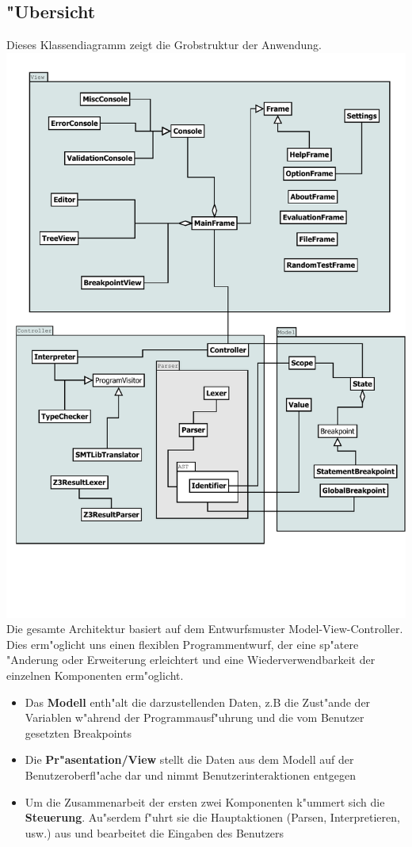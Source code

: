 \documentclass[10pt,a4paper,titlepage]{article}
\begin{document}
\subsection{"Ubersicht}
Dieses Klassendiagramm zeigt die Grobstruktur der Anwendung. \\
\includegraphics[scale=0.8]{images/ClassOverview.pdf} \\
Die gesamte Architektur basiert auf dem Entwurfsmuster Model-View-Controller. Dies erm"oglicht uns einen flexiblen Programmentwurf, der eine sp"atere "Anderung oder Erweiterung erleichtert und eine Wiederverwendbarkeit der einzelnen Komponenten erm"oglicht. 
\begin{itemize}
\item Das \textbf{Modell} enth"alt die darzustellenden Daten, z.B die Zust"ande der Variablen w"ahrend der Programmausf"uhrung und die vom Benutzer gesetzten Breakpoints
\item Die \textbf{Pr"asentation/View} stellt die Daten aus dem Modell auf der Benutzeroberfl"ache dar und nimmt Benutzerinteraktionen entgegen
\item Um die Zusammenarbeit der ersten zwei Komponenten k"ummert sich die \textbf{Steuerung}. Au"serdem f"uhrt sie die Hauptaktionen (Parsen, Interpretieren, usw.) aus und bearbeitet die Eingaben des Benutzers \\\\
\end{itemize} 
\end{document}
